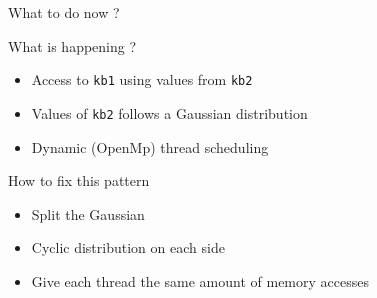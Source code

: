 \documentclass[xcolor={usenames,dvipsnames}]{beamer}
\begin{document}
\begin{frame}{What to do now ?}
    \begin{exampleblock}{What is happening ?}
        \begin{itemize}
            \item Access to \texttt{kb1} using values from \texttt{kb2}
            \item Values of \texttt{kb2} follows a Gaussian distribution
            \item Dynamic (OpenMp) thread scheduling
        \end{itemize}
    \end{exampleblock}
    \pause
    \begin{alertblock}{How to fix this pattern}
        \begin{itemize}
            \item Split the Gaussian
            \item Cyclic distribution on each side
            \item Give each thread the same amount of memory accesses
        \end{itemize}
    \end{alertblock}
\end{frame}
\end{document}
